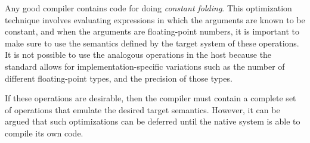 Any good compiler contains code for doing \emph{constant folding}.
This optimization technique involves evaluating expressions in which
the arguments are known to be constant, and when the arguments are
floating-point numbers, it is important to make sure to use the
semantics defined by the target \commonlisp{} system of these
operations.  It is not possible to use the analogous operations in the
host because the \commonlisp{} standard allows for
implementation-specific variations such as the number of different
floating-point types, and the precision of those types.

If these operations are desirable, then the compiler must contain a
complete set of operations that emulate the desired target semantics.
However, it can be argued that such optimizations can be deferred
until the native system is able to compile its own code.
